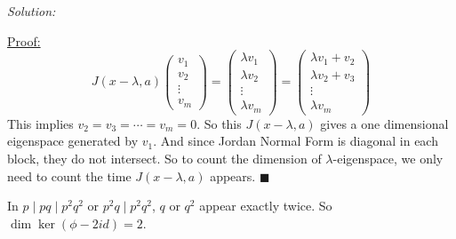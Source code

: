 \documentclass[a4paper, 12pt]{article}
\newenvironment{solution}
    {\textit{Solution:}}
    {}
\newenvironment{claimproof}[1]{\par\noindent\underline{Proof:}\space#1}{\hfill $\blacksquare$}
\begin{document}
\begin{solution}
\begin{enumerate}[(a)]
\begin{claimproof}
\[J(x-\lambda,a)\begin{pmatrix}
	v_1\\ 
	v_2\\ 
	\vdots\\ 
	v_m
\end{pmatrix}=\begin{pmatrix}
	\lambda v_1\\ 
	\lambda v_2\\ 
	\vdots\\ 
	\lambda v_m
\end{pmatrix}=\begin{pmatrix}
	\lambda v_1+v_2\\ 
	\lambda v_2+v_3\\ 
	\vdots\\ 
	\lambda v_m
\end{pmatrix}\]
This implies \(v_2=v_3=\cdots=v_m=0\). So this \(J(x-\lambda,a)\) gives a one dimensional eigenspace generated by \(v_1\). And since Jordan Normal Form is diagonal in each block, they do not intersect. So to count 
the dimension of \(\lambda\)-eigenspace, we only need to count the time \(J(x-\lambda,a)\) appears. 
\end{claimproof}

In \(p\mid pq\mid p^2q^2\) or \(p^2q\mid p^2q^2\), \(q\) or \(q^2\) appear exactly twice. So \(\dim \ker (\phi-2id)=2\).
\end{enumerate} 
\end{solution}
\end{document}

